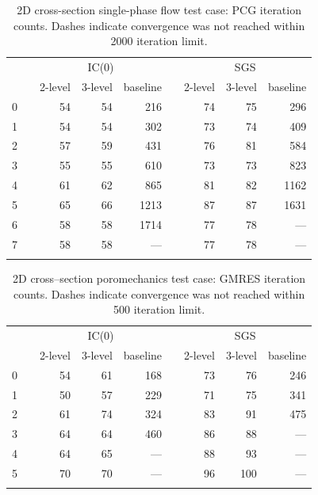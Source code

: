 \begin{table}
    \centering
    \caption{2D cross-section single-phase flow test case: PCG iteration counts.   Dashes indicate convergence was not reached within 2000 iteration limit.}
    \label{tab:cross_section_conv_flow}
    \begin{tabular}{rrrrrrrrr}
        \hline\noalign{\smallskip}
        \multirow{2}{*}{$\ell$} & & \multicolumn{3}{c}{IC(0)} & & \multicolumn{3}{c}{SGS} \\
        \noalign{\smallskip}\cline{3-5} \cline{7-9}\noalign{\smallskip}
        & & 2-level & 3-level & baseline & & 2-level & 3-level & baseline \\
        \hline\noalign{\smallskip}
        0 & & 54 & 54 &  216 & & 74 & 75 &  296 \\
        1 & & 54 & 54 &  302 & & 73 & 74 &  409 \\
        2 & & 57 & 59 &  431 & & 76 & 81 &  584 \\
        3 & & 55 & 55 &  610 & & 73 & 73 &  823 \\
        4 & & 61 & 62 &  865 & & 81 & 82 & 1162 \\
        5 & & 65 & 66 & 1213 & & 87 & 87 & 1631 \\
        6 & & 58 & 58 & 1714 & & 77 & 78 &  --- \\
        7 & & 58 & 58 &  --- & & 77 & 78 &  --- \\
        \hline\noalign{\smallskip}
    \end{tabular}
\end{table}

\begin{table}
    \centering
    \caption{2D cross--section poromechanics test case: GMRES iteration counts.   Dashes indicate convergence was not reached within 500 iteration limit.}
    \label{tab:cross_section_conv_poro}
    \begin{tabular}{rrrrrrrrr}
        \hline\noalign{\smallskip}
        \multirow{2}{*}{$\ell$} & & \multicolumn{3}{c}{IC(0)} & & \multicolumn{3}{c}{SGS} \\
        \noalign{\smallskip}\cline{3-5} \cline{7-9}\noalign{\smallskip}
        & & 2-level & 3-level & baseline & & 2-level & 3-level & baseline \\
        \hline\noalign{\smallskip}
        0 & & 54 & 61 & 168 & & 73 &  76 & 246 \\
        1 & & 50 & 57 & 229 & & 71 &  75 & 341 \\
        2 & & 61 & 74 & 324 & & 83 &  91 & 475 \\
        3 & & 64 & 64 & 460 & & 86 &  88 & --- \\
        4 & & 64 & 65 & --- & & 88 &  93 & --- \\
        5 & & 70 & 70 & --- & & 96 & 100 & --- \\
        \hline\noalign{\smallskip}
    \end{tabular}
\end{table}

